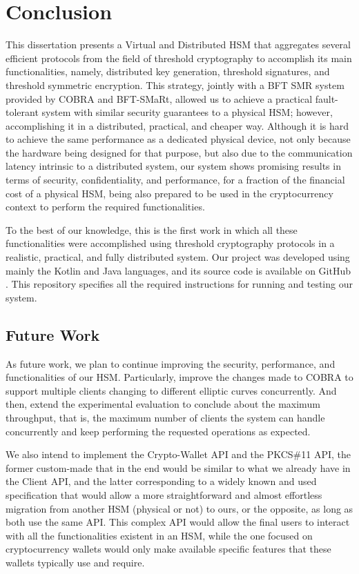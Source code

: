 \chapter{Conclusion} \label{chap:conclusion}

This dissertation presents a Virtual and Distributed HSM that aggregates several efficient protocols from the field of threshold cryptography to accomplish its main functionalities, namely, distributed key generation, threshold signatures, and threshold symmetric encryption. This strategy, jointly with a BFT SMR system provided by COBRA and BFT-SMaRt, allowed us to achieve a practical fault-tolerant system with similar security guarantees to a physical HSM; however, accomplishing it in a distributed, practical, and cheaper way. Although it is hard to achieve the same performance as a dedicated physical device, not only because the hardware being designed for that purpose, but also due to the communication latency intrinsic to a distributed system, our system shows promising results in terms of security, confidentiality, and performance, for a fraction of the financial cost of a physical HSM, being also prepared to be used in the cryptocurrency context to perform the required functionalities.

To the best of our knowledge, this is the first work in which all these functionalities were accomplished using threshold cryptography protocols in a realistic, practical, and fully distributed system. Our project was developed using mainly the Kotlin and Java languages, and its source code is available on GitHub \cite{thresholdhsmgithub}. This repository specifies all the required instructions for running and testing our system.


\section{Future Work} \label{sec: future-work}

As future work, we plan to continue improving the security, performance, and functionalities of our HSM. Particularly, improve the changes made to COBRA to support multiple clients changing to different elliptic curves concurrently. And then, extend the experimental evaluation to conclude about the maximum throughput, that is, the maximum number of clients the system can handle concurrently and keep performing the requested operations as expected. 

We also intend to implement the Crypto-Wallet API and the PKCS\#11 API, the former custom-made that in the end would be similar to what we already have in the Client API, and the latter corresponding to a widely known and used specification that would allow a more straightforward and almost effortless migration from another HSM (physical or not) to ours, or the opposite, as long as both use the same API. This complex API would allow the final users to interact with all the functionalities existent in an HSM, while the one focused on cryptocurrency wallets would only make available specific features that these wallets typically use and require.

